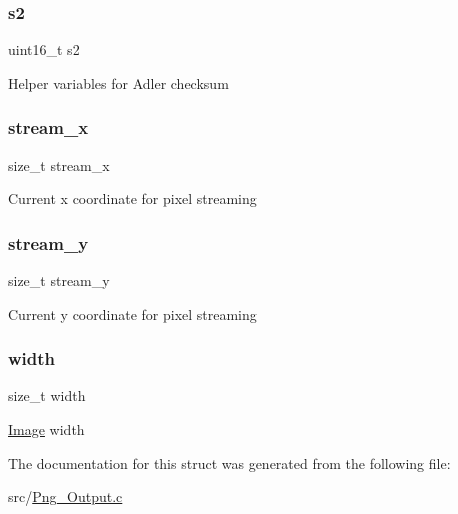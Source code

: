 \subsubsection{\texorpdfstring{s2}{s2}}
{\footnotesize\ttfamily uint16\+\_\+t s2}

Helper variables for Adler checksum \mbox{\label{structpng__t_aac2e70794d77a569d02e9db38669f145}} 
\subsubsection{\texorpdfstring{stream\+\_\+x}{stream\_x}}
{\footnotesize\ttfamily size\+\_\+t stream\+\_\+x}

Current x coordinate for pixel streaming \mbox{\label{structpng__t_a7b8b9225ada455d197dee07a4a25b910}} 
\subsubsection{\texorpdfstring{stream\+\_\+y}{stream\_y}}
{\footnotesize\ttfamily size\+\_\+t stream\+\_\+y}

Current y coordinate for pixel streaming \mbox{\label{structpng__t_a02bed8590a9ddf520e58a060059518ec}} 
\subsubsection{\texorpdfstring{width}{width}}
{\footnotesize\ttfamily size\+\_\+t width}

\hyperlink{struct_image}{Image} width 

The documentation for this struct was generated from the following file\+:\begin{DoxyCompactItemize}
\item 
src/\hyperlink{_png___output_8c}{Png\+\_\+\+Output.\+c}\end{DoxyCompactItemize}

